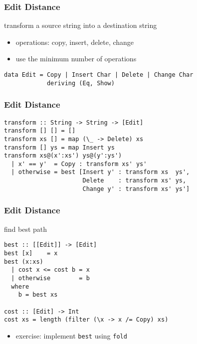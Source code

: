 \documentclass[dvipsnames]{beamer}
\theoremstyle{plain}
\begin{document}
\begin{frame}[fragile]
  \frametitle{Edit Distance}

  \begin{exampleblock}{transform a source string into a destination string}
    \begin{itemize}
      \item operations: copy, insert, delete, change
      \item use the minimum number of operations
    \end{itemize}

    \begin{lstlisting}
data Edit = Copy | Insert Char | Delete | Change Char
            deriving (Eq, Show)
    \end{lstlisting}
  \end{exampleblock}
\end{frame}

\begin{frame}[fragile]
  \frametitle{Edit Distance}

  \begin{exampleblock}{}
    \begin{lstlisting}
transform :: String -> String -> [Edit]
transform [] [] = []
transform xs [] = map (\_ -> Delete) xs
transform [] ys = map Insert ys
transform xs@(x':xs') ys@(y':ys')
  | x' == y'  = Copy : transform xs' ys'
  | otherwise = best [Insert y' : transform xs  ys',
                      Delete    : transform xs' ys,
                      Change y' : transform xs' ys']
    \end{lstlisting}
  \end{exampleblock}
\end{frame}

\begin{frame}[fragile]
  \frametitle{Edit Distance}

  \begin{exampleblock}{find best path}
    \begin{lstlisting}
best :: [[Edit]] -> [Edit]
best [x]    = x
best (x:xs)
  | cost x <= cost b = x
  | otherwise        = b
  where
    b = best xs

cost :: [Edit] -> Int
cost xs = length (filter (\x -> x /= Copy) xs)
    \end{lstlisting}
  \end{exampleblock}

  \pause
  \begin{itemize}
    \item exercise: implement \lstinline|best| using \lstinline|fold|
  \end{itemize}
\end{frame}
\end{document}
